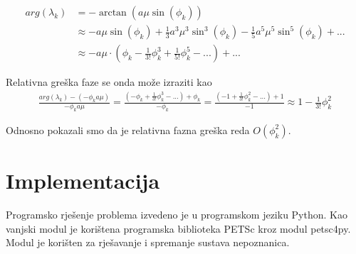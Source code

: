 \documentclass{article}
\begin{document}
\begin{align*}
    arg(\lambda_k) &= -\arctan{(a \mu \sin(\phi_k))} \\
    &\approx -a \mu \sin(\phi_k)
        + \frac{1}{3} a^3 \mu^3 \sin^3(\phi_k)
        - \frac{1}{5} a^5 \mu^5 \sin^5(\phi_k) + ... \\
    &\approx -a \mu \cdot
        \left( \phi_k - \frac{1}{3!}\phi_k^3 + \frac{1}{5!}\phi_k^5 -...\right)
        + ...
\end{align*}

Relativna greška faze se onda može izraziti kao
\begin{align*}
    \frac{arg(\lambda_k) - (- \phi_k a \mu)}{-\phi_k a \mu} =
        \frac{(-\phi_k + \frac{1}{3!}\phi_k^3 - ...) + \phi_k}{-\phi_k} =
        \frac{(-1 + \frac{1}{3!}\phi_k^2 - ...) + 1}{-1} \approx
        1 - \frac{1}{3!}\phi_k^2
\end{align*}

Odnosno pokazali smo da je relativna fazna greška reda $O(\phi_k^2)$.

\section{Implementacija}

Programsko rješenje problema izvedeno je u programskom jeziku Python. Kao
vanjski modul je korištena programska biblioteka PETSc kroz modul petsc4py.
Modul je korišten za rješavanje i spremanje sustava nepoznanica.
\end{document}

